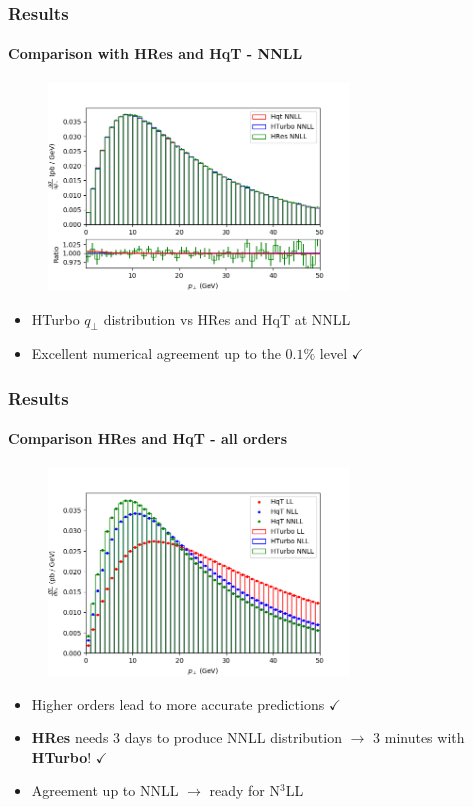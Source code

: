\documentclass[aspectratio=43]{beamer}
\begin{document}
\begin{frame}

	\frametitle{Results}
	\framesubtitle{Comparison with HRes and HqT - NNLL}
	
	\begin{figure}
		\includegraphics[width = 8cm]{plots/hturbo_NNLL.png}
	\end{figure}
	
	\begin{itemize}
		\item \footnotesize HTurbo $q_{\perp}$ distribution vs HRes and HqT at NNLL
		\item \footnotesize Excellent numerical agreement up to the $0.1\%$ level {\color{darkgreen}$\checkmark$} 
\end{itemize}

\end{frame}

\begin{frame}
	
	\frametitle{Results}
	\framesubtitle{Comparison HRes and HqT - all orders}
	
	\begin{figure}
		\includegraphics[width = 8cm]{plots/hturbo_all_orders.png}
	\end{figure}
	
	\begin{itemize}
		\item \footnotesize Higher orders lead to more accurate predictions {\color{darkgreen}$\checkmark$} 
		\item \footnotesize \textbf{HRes} needs 3 days to produce NNLL distribution $\rightarrow$ {\color{blue} 3 minutes with \textbf{HTurbo}!} {\color{darkgreen}$\checkmark$} 
		\item \footnotesize Agreement up to NNLL $\longrightarrow$ {\color{blue}ready for N$^{3}$LL}
	\end{itemize}

\end{frame}
\end{document}
